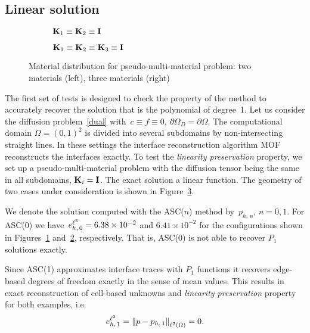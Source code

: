 \subsection{Linear solution}

\begin{figure}[h]
	\centering
	\begin{subfigure}{.41\linewidth}
		\centering
		\caption{$\boldsymbol{\mathbf{K}}_1 \equiv \boldsymbol{\mathbf{K}}_2 \equiv \boldsymbol{\mathbf{I}}$}
		\label{fig:fake:2}
	\end{subfigure}%
	\hfill
	\begin{subfigure}{.41\linewidth}
		\centering
		\caption{$\boldsymbol{\mathbf{K}}_1 \equiv \boldsymbol{\mathbf{K}}_2 \equiv \boldsymbol{\mathbf{K}}_3 \equiv \boldsymbol{\mathbf{I}}$}
		\label{fig:fake:3}
	\end{subfigure}
	\caption{Material distribution for pseudo-multi-material problem: two materials (left), three materials (right)
	\label{fig:fake}}		
\end{figure}

The first set of tests is designed to check the property of the method to accurately recover the solution that is the polynomial of degree~1. Let us consider the diffusion problem~\eqref{dual} with~$c \equiv f \equiv 0$, $\partial\Omega_D = \partial\Omega$. The computational domain $\Omega=(0,1)^2$ is divided into several subdomains by non-intersecting straight lines. In these settings the interface reconstruction algorithm MOF reconstructs the interfaces exactly. To test the {\it linearity preservation} property, we set up a pseudo-multi-material problem with the diffusion tensor being the same in all subdomains, $\boldsymbol{\mathbf{K}}_i = \boldsymbol{\mathbf{I}}$. The exact solution a linear function. The geometry of two cases under consideration is shown in Figure~\ref{fig:fake}.
	
We denote the solution computed  with the ASC($n$) method by~$p_{h,\,n}$, $n = 0, 1$. For ASC(0) we have~$e^{{\ell^2}}_{h,\,0} = 6.38 \times 10^{-2}$ and $6.41 \times 10^{-2}$ for the configurations shown in Figures~\ref{fig:fake:2} and~\ref{fig:fake:3}, respectively. That is, ASC(0) is not able to recover $P_1$ solutions exactly.

Since ASC(1) approximates interface traces with $P_1$ functions it recovers edge-based degrees of freedom exactly in the sense of mean values. This results in exact reconstruction of cell-based unknowns and {\it linearity preservation} property for both examples, i.e.
\begin{equation*}
	e^{{\ell^2}}_{h,\,1} = \left\| p - p_{h,\,1} \right\|_{{\ell^2\left({\Omega}\right)}} = 0.
\end{equation*}

